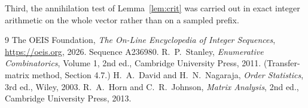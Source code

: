 \documentclass[11pt,a4paper]{article}
\theoremstyle{plain}
\theoremstyle{definition}
\begin{document}
Third, the annihilation test of Lemma~\ref{lem:crit} was carried out in exact integer
arithmetic on the whole vector rather than on a sampled prefix.

\begin{thebibliography}{9}
 The OEIS Foundation, \emph{The On-Line Encyclopedia of Integer
Sequences}, \url{https://oeis.org}, 2026. Sequence A236980.
 R.~P.~Stanley, \emph{Enumerative Combinatorics}, Volume 1, 2nd ed.,
Cambridge University Press, 2011. (Transfer-matrix method, Section 4.7.)
 H.~A.~David and H.~N.~Nagaraja, \emph{Order Statistics}, 3rd ed., Wiley,
2003.
 R.~A.~Horn and C.~R.~Johnson, \emph{Matrix Analysis}, 2nd ed., Cambridge
University Press, 2013.
\end{thebibliography}
\end{document}
